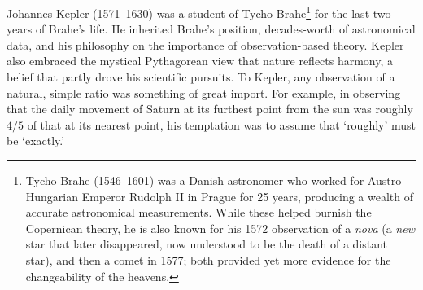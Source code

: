 \label{pg:keplerslaws}

Johannes Kepler (1571--1630) was a student of Tycho Brahe\footnote{Tycho Brahe (1546--1601) was a Danish astronomer who worked for Austro-Hungarian Emperor Rudolph II in Prague for 25 years, producing a wealth of accurate astronomical measurements. While these helped burnish the Copernican theory, he is also known for his 1572 observation of a \emph{nova} (a \emph{new} star that later disappeared, now understood to be the death of a distant star), and then a comet in 1577; both provided yet more evidence for the changeability of the heavens.} for the last two years of Brahe's life. He inherited Brahe's position, decades-worth of astronomical data, and his philosophy on the importance of observation-based theory. Kepler also embraced the mystical Pythagorean view that nature reflects harmony, a belief that partly drove his scientific pursuits. To Kepler, any observation of a natural, simple ratio was something of great import. For example, in observing that the daily movement of Saturn at its furthest point from the sun was roughly $4/5$ of that at its nearest point, his temptation was to assume that `roughly' must be `exactly.'\par

